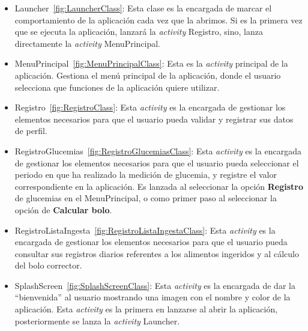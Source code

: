 \begin{itemize}
	\item Launcher~\ref{fig:LauncherClass}: Esta clase es la encargada de marcar el comportamiento de la aplicación cada vez que la abrimos. Si es la primera vez que se ejecuta la aplicación, lanzará la \textit{activity} Registro, sino, lanza directamente la \textit{activity} MenuPrincipal.
	\item MenuPrincipal~\ref{fig:MenuPrincipalClass}: Esta es la \textit{activity} principal de la aplicación. Gestiona el menú principal de la aplicación, donde el usuario selecciona que funciones de la aplicación quiere utilizar.
	\item Registro~\ref{fig:RegistroClass}: Esta \textit{activity} es la encargada de gestionar los elementos necesarios para que el usuario pueda validar y registrar sus datos de perfil.
	\item RegistroGlucemias~\ref{fig:RegistroGlucemiasClass}: Esta \textit{activity} es la encargada de gestionar los elementos necesarios para que el usuario pueda seleccionar el periodo en que ha realizado la medición de glucemia, y registre el valor correspondiente en la aplicación. Es lanzada al seleccionar la opción \textbf{Registro} de glucemias en
el MenuPrincipal, o como primer paso al seleccionar la opción de \textbf{Calcular bolo}.
	\item RegistroListaIngesta~\ref{fig:RegistroListaIngestaClass}: Esta \textit{activity} es la encargada de gestionar los elementos necesarios para que el usuario pueda consultar sus registros diarios referentes a los alimentos ingeridos y al cálculo del bolo corrector.
	\item SplashScreen~\ref{fig:SplashScreenClass}:  Esta \textit{activity} es la encargada de dar la ``bienvenida'' al usuario mostrando una imagen con el nombre y color de la aplicación. Esta \textit{activity} es la primera en lanzarse al abrir la aplicación, posteriormente se lanza la \textit{activity} Launcher.
\end{itemize}

